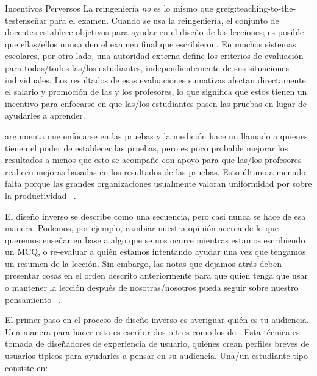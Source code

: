 \begin{aside}{Incentivos Perversos}
La reingeniería \emph{no} es lo mismo que gref{g:teaching-to-the-test}{enseñar para el examen}.
Cuando se usa la reingeniería,
el conjunto de docentes establece objetivos para ayudar en el diseño de las lecciones;
es posible que ellas/ellos nunca den el examen final que escribieron.
En muchos sistemas escolares,
por otro lado,
una autoridad externa define los criterios de evaluación para todas/todos las/los estudiantes,
independientemente de sus situaciones individuales.
Los resultados de esas evaluaciones sumativas afectan directamente el salario y promoción de las y los profesores,
lo que significa que estos tienen un incentivo para enfocarse en que las/los estudiantes pasen las pruebas en lugar de ayudarles a aprender.
 
\cite{Gree2014} argumenta que enfocarse en las pruebas y la medición hace un llamado a quienes tienen el poder de establecer las  pruebas, pero es poco probable mejorar los resultados
a menos que esto se acompañe con apoyo para que las/los profesores realicen mejoras basadas en los resultados de las pruebas.
Esto último a menudo falta porque
las grandes organizaciones usualmente valoran uniformidad por sobre la productividad ~\cite{Scot1998}.
\end{aside}
 
El diseño inverso se describe como una secuencia,
pero casi nunca se hace de esa manera.
Podemos,
por ejemplo, cambiar nuestra opinión acerca de lo que queremos enseñar
en base a algo que se nos ocurre mientras estamos escribiendo un MCQ,
o re-evaluar a quién estamos intentando ayudar una vez que tengamos un resumen de la lección.
Sin embargo,
las notas que dejamos atrás deben presentar cosas en el orden descrito anteriormente para que quien tenga que usar o mantener la lección después de nosotras/nosotros pueda seguir sobre nuestro pensamiento
~\cite{Parn1986}.
 
 
El primer paso en el proceso de diseño inverso es averiguar quién es tu audiencia.
Una manera para hacer esto es escribir dos o tres
como los de .
Esta técnica es tomada de diseñadores de experiencia de usuario,
quienes crean perfiles breves de usuarios típicos
para ayudarles a pensar en su audiencia.
Una/un estudiante tipo consiste en:
 
